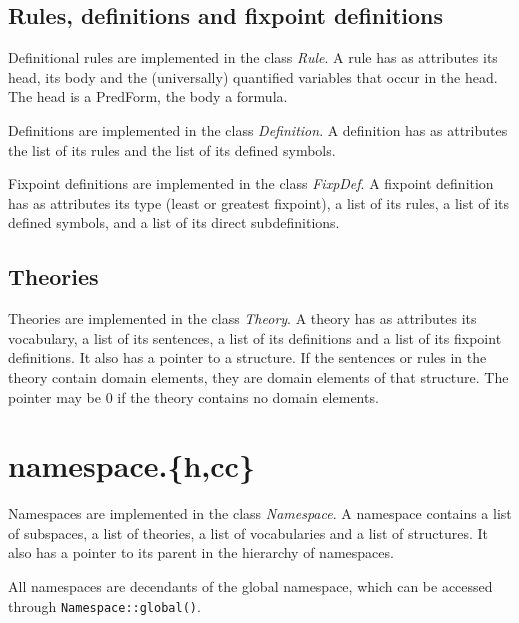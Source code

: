 \documentclass{article}
\begin{document}
\subsection*{Rules, definitions and fixpoint definitions}

Definitional rules are implemented in the class \emph{Rule}. A rule has as attributes its head, its body and the (universally) quantified variables that occur in the head. The head is a PredForm, the body a formula.

Definitions are implemented in the class \emph{Definition}. A definition has as attributes the list of its rules and the list of its defined symbols.

Fixpoint definitions are implemented in the class \emph{FixpDef}. A fixpoint definition has as attributes its type (least or greatest fixpoint), a list of its rules, a list of its defined symbols, and a list of its direct subdefinitions.

\subsection*{Theories}

Theories are implemented in the class \emph{Theory}. A theory has as attributes its vocabulary, a list of its sentences, a list of its definitions and a list of its fixpoint definitions. It also has a pointer to a structure. If the sentences or rules in the theory contain domain elements, they are domain elements of that structure. The pointer may be $0$ if the theory contains no domain elements.

\section{namespace.\{h,cc\}}

Namespaces are implemented in the class \emph{Namespace}. A namespace contains a list of subspaces, a list of theories, a list of vocabularies and a list of structures. It also has a pointer to its parent in the hierarchy of namespaces. 

All namespaces are decendants of the global namespace, which can be accessed through \texttt{Namespace::global()}.
\end{document}
